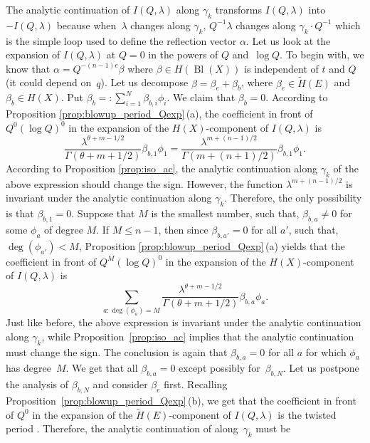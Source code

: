 \documentclass[pdftex]{sigma}
\numberwithin{equation}{section}
\newcommand{\leftexp}[2]{{\vphantom{#2}}^{#1}{#2}}
\begin{document}
The analytic continuation of $I(Q,\lambda)$ along $\gamma_k$ transforms $I(Q,\lambda)$ into $-I(Q,\lambda)$ because when~$\lambda$ changes along $\gamma_k$, $Q^{-1}\lambda$ changes along $\gamma_k\cdot Q^{-1}$ which is the simple loop used to define the reflection vector $\alpha$. Let us look at the expansion of $I(Q,\lambda)$ at $Q=0$ in the powers of $Q$ and~$\log Q$. To begin with, we know that $\alpha= Q^{-(n-1)e}\beta$ where $\beta\in H(\operatorname{Bl}(X))$ is independent of $t$ and $Q$ (it could depend on~$q$). Let us decompose $\beta=\beta_e+\beta_b$, where $\beta_e\in \widetilde{H}(E)$ and $\beta_b\in H(X)$. Put $\beta_b=:\sum_{i=1}^N \beta_{b,i} \phi_i$. We claim that $\beta_b=0$. According to Proposition \ref{prop:blowup_period_Qexp}\,(a), the coefficient in front of $Q^0(\log Q)^0$ in the expansion of the $H(X)$-component of $I(Q,\lambda)$ is
\[
\frac{\lambda^{\theta+m-1/2}}{\Gamma(\theta+m+1/2)} \beta_{b,1}\phi_1 =
\frac{\lambda^{m+(n-1)/2}}{\Gamma(m+(n+1)/2)} \beta_{b,1}\phi_1.
\]
According to Proposition \ref{prop:iso_ac}, the analytic continuation along $\gamma_k$ of the above expression should change the sign. However, the function $\lambda^{m+(n-1)/2}$ is invariant under the analytic continuation along $\gamma_k$. Therefore, the only possibility is that $\beta_{b,1}=0$. Suppose that $M$ is the smallest number, such that, $\beta_{b,a}\neq 0$ for some $\phi_a$ of degree $M$. If $M\leq n-1$, then since $\beta_{b,a'}=0$ for all $a'$, such that, $\operatorname{deg}(\phi_{a'})<M$, Proposition \ref{prop:blowup_period_Qexp}\,(a) yields that the coefficient in front of $Q^M (\log Q)^0$ in the expansion of the $H(X)$-component of $I(Q,\lambda)$ is
\[
\sum_{a: \operatorname{deg}(\phi_a)=M}
\frac{\lambda^{\theta+m-1/2}}{\Gamma(\theta+m+1/2)} \beta_{b,a}\phi_a.
\]
Just like before, the above expression is invariant under the analytic continuation along $\gamma_k$, while Proposition~\ref{prop:iso_ac} implies that the analytic continuation must change the sign. The conclusion is again that $\beta_{b,a}=0$ for all $a$ for which $\phi_a$ has degree~$M$. We get that all $\beta_{b,a}=0$ except possibly for~$\beta_{b,N}$. Let us postpone the analysis of $\beta_{b,N}$ and consider $\beta_{e}$ first. Recalling Proposition~\ref{prop:blowup_period_Qexp}\,(b), we get that the coefficient in front of $Q^0$ in the expansion of the $\widetilde{H}(E)$-component of $I(Q,\lambda)$ is the twisted period
\smash{$\leftexp{tw}{I}^{(-m)}_{\beta_e}(1,\lambda)$}.
Therefore, the analytic continuation of
\smash{$\leftexp{tw}{I}^{(-m)}_{\beta_e}(1,\lambda)$} along~$\gamma_k$ must be
\end{document}
